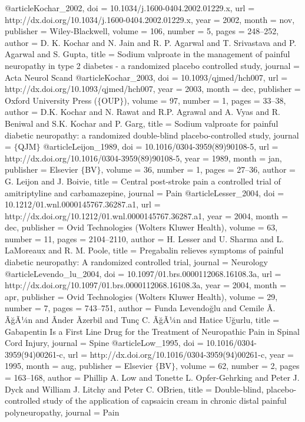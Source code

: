 @article{Kochar_2002,
	doi = {10.1034/j.1600-0404.2002.01229.x},
	url = {http://dx.doi.org/10.1034/j.1600-0404.2002.01229.x},
	year = 2002,
	month = {nov},
	publisher = {Wiley-Blackwell},
	volume = {106},
	number = {5},
	pages = {248--252},
	author = {D. K. Kochar and N. Jain and R. P. Agarwal and T. Srivastava and P. Agarwal and S. Gupta},
	title = {Sodium valproate in the management of painful neuropathy in type 2 diabetes - a randomized placebo controlled study},
	journal = {Acta Neurol Scand}
}
@article{Kochar_2003,
	doi = {10.1093/qjmed/hch007},
	url = {http://dx.doi.org/10.1093/qjmed/hch007},
	year = 2003,
	month = {dec},
	publisher = {Oxford University Press ($\lbrace$OUP$\rbrace$)},
	volume = {97},
	number = {1},
	pages = {33--38},
	author = {D.K. Kochar and N. Rawat and R.P. Agrawal and A. Vyas and R. Beniwal and S.K. Kochar and P. Garg},
	title = {Sodium valproate for painful diabetic neuropathy: a randomized double-blind placebo-controlled study},
	journal = {$\lbrace$QJM$\rbrace$}
}
@article{Leijon_1989,
	doi = {10.1016/0304-3959(89)90108-5},
	url = {http://dx.doi.org/10.1016/0304-3959(89)90108-5},
	year = 1989,
	month = {jan},
	publisher = {Elsevier $\lbrace$BV$\rbrace$},
	volume = {36},
	number = {1},
	pages = {27--36},
	author = {G. Leijon and J. Boivie},
	title = {Central post-stroke pain {\textemdash} a controlled trial of amitriptyline and carbamazepine},
	journal = {Pain}
}
@article{Lesser_2004,
	doi = {10.1212/01.wnl.0000145767.36287.a1},
	url = {http://dx.doi.org/10.1212/01.wnl.0000145767.36287.a1},
	year = 2004,
	month = {dec},
	publisher = {Ovid Technologies (Wolters Kluwer Health)},
	volume = {63},
	number = {11},
	pages = {2104--2110},
	author = {H. Lesser and U. Sharma and L. LaMoreaux and R. M. Poole},
	title = {Pregabalin relieves symptoms of painful diabetic neuropathy: A randomized controlled trial},
	journal = {Neurology}
}
@article{Levendo_lu_2004,
	doi = {10.1097/01.brs.0000112068.16108.3a},
	url = {http://dx.doi.org/10.1097/01.brs.0000112068.16108.3a},
	year = 2004,
	month = {apr},
	publisher = {Ovid Technologies (Wolters Kluwer Health)},
	volume = {29},
	number = {7},
	pages = {743--751},
	author = {Funda Levendo{\u{g}}lu and Cemile Ã. Ã{\u{g}}Ã¼n and Ãnder Ãzerbil and Tun{\c{c}} C. Ã{\u{g}}Ã¼n and Hatice U{\u{g}}urlu},
	title = {Gabapentin Is a First Line Drug for the Treatment of Neuropathic Pain in Spinal Cord Injury},
	journal = {Spine}
}
@article{Low_1995,
	doi = {10.1016/0304-3959(94)00261-c},
	url = {http://dx.doi.org/10.1016/0304-3959(94)00261-c},
	year = 1995,
	month = {aug},
	publisher = {Elsevier $\lbrace$BV$\rbrace$},
	volume = {62},
	number = {2},
	pages = {163--168},
	author = {Phillip A. Low and Tonette L. Opfer-Gehrking and Peter J. Dyck and William J. Litchy and Peter C. O{\textquotesingle}Brien},
	title = {Double-blind, placebo-controlled study of the application of capsaicin cream in chronic distal painful polyneuropathy},
	journal = {Pain}
}
